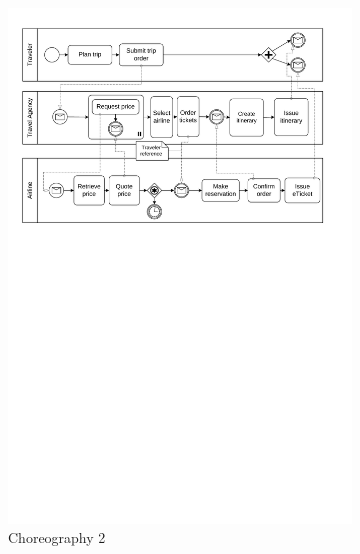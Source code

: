 \begin{figure}
\begin{subfigure}{.3\textwidth}
    \includegraphics[width=\textwidth]{figures/choreography.pdf}
    \caption{Choreography 2}
    \label{fig:subfigB}
  \end{subfigure}
  \hfill
  \begin{subfigure}{.3\textwidth}

\end{subfigure}
\end{figure}
